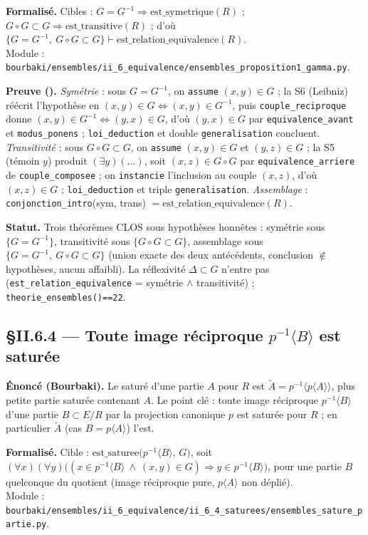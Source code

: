 \textbf{Formalisé.} Cibles : $G = G^{-1} \Rightarrow \mathrm{est\_symetrique}(R)$ ;
$G \circ G \subset G \Rightarrow \mathrm{est\_transitive}(R)$ ; d'où
$\{G = G^{-1},\ G \circ G \subset G\} \vdash \mathrm{est\_relation\_equivalence}(R)$. \\
Module : \texttt{bourbaki/ensembles/ii\_6\_equivalence/ensembles\_proposition1\_gamma.py}.

\textbf{Preuve (\Nstar).} \emph{Symétrie} : sous $G = G^{-1}$, on \texttt{assume} $(x,y) \in G$ ;
la S6 (Leibniz) réécrit l'hypothèse en $(x,y)\in G \Leftrightarrow (x,y)\in G^{-1}$, puis
\texttt{couple\_reciproque} donne $(x,y)\in G^{-1} \Leftrightarrow (y,x)\in G$, d'où $(y,x)\in G$
par \texttt{equivalence\_avant} et \texttt{modus\_ponens} ; \texttt{loi\_deduction} et double
\texttt{generalisation} concluent. \emph{Transitivité} : sous $G\circ G \subset G$, on \texttt{assume}
$(x,y)\in G$ et $(y,z)\in G$ ; la S5 (témoin $y$) produit $(\exists y)(\ldots)$, soit $(x,z)\in G\circ G$
par \texttt{equivalence\_arriere} de \texttt{couple\_composee} ; on \texttt{instancie} l'inclusion au
couple $(x,z)$, d'où $(x,z)\in G$ ; \texttt{loi\_deduction} et triple \texttt{generalisation}.
\emph{Assemblage} : \texttt{conjonction\_intro}(sym, trans) $= \mathrm{est\_relation\_equivalence}(R)$.

\textbf{Statut.} Trois théorèmes CLOS sous hypothèses honnêtes : symétrie sous $\{G = G^{-1}\}$,
transitivité sous $\{G \circ G \subset G\}$, assemblage sous $\{G = G^{-1},\ G \circ G \subset G\}$
(union exacte des deux antécédents, conclusion $\notin$ hypothèses, aucun affaibli). La réflexivité
$\Delta \subset G$ n'entre pas (\texttt{est\_relation\_equivalence} = symétrie $\wedge$ transitivité) ;
\texttt{theorie\_ensembles()==22}.

\subsection{§II.6.4 --- Toute image réciproque $p^{-1}\langle B\rangle$ est saturée}
\textbf{Énoncé (Bourbaki).} Le saturé d'une partie $A$ pour $R$ est $\tilde{A} = p^{-1}\langle p\langle A\rangle\rangle$,
plus petite partie saturée contenant $A$. Le point clé : toute image réciproque $p^{-1}\langle B\rangle$
d'une partie $B \subset E/R$ par la projection canonique $p$ est saturée pour $R$ ; en particulier
$\tilde{A}$ (cas $B = p\langle A\rangle$) l'est.

\textbf{Formalisé.} Cible : $\mathrm{est\_saturee}\bigl(p^{-1}\langle B\rangle,\, G\bigr)$, soit
$(\forall x)(\forall y)\bigl((x \in p^{-1}\langle B\rangle \ \wedge\ (x,y)\in G) \Rightarrow y \in p^{-1}\langle B\rangle\bigr)$,
pour une partie $B$ quelconque du quotient (image réciproque pure, $p\langle A\rangle$ non déplié). \\
Module : \texttt{bourbaki/ensembles/ii\_6\_equivalence/ii\_6\_4\_saturees/ensembles\_sature\_partie.py}.

